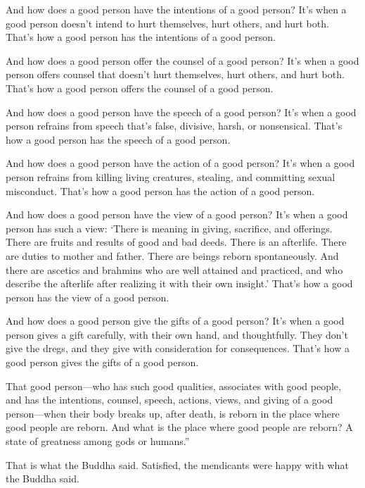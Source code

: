 \documentclass[12pt,openany]{book}%
\let\oldcontentsline\contentsline
\newcommand{\nopagecontentsline}[3]{\oldcontentsline{#1}{#2}{}}
\begin{document}
And how does a good person have the intentions of a good person? It’s when a good person doesn’t intend to hurt themselves, hurt others, and hurt both. That’s how a good person has the intentions of a good person. 

And how does a good person offer the counsel of a good person? It’s when a good person offers counsel that doesn’t hurt themselves, hurt others, and hurt both. That’s how a good person offers the counsel of a good person. 

And how does a good person have the speech of a good person? It’s when a good person refrains from speech that’s false, divisive, harsh, or nonsensical. That’s how a good person has the speech of a good person. 

And how does a good person have the action of a good person? It’s when a good person refrains from killing living creatures, stealing, and committing sexual misconduct. That’s how a good person has the action of a good person. 

And how does a good person have the view of a good person? It’s when a good person has such a view: ‘There is meaning in giving, sacrifice, and offerings. There are fruits and results of good and bad deeds. There is an afterlife. There are duties to mother and father. There are beings reborn spontaneously. And there are ascetics and brahmins who are well attained and practiced, and who describe the afterlife after realizing it with their own insight.’ That’s how a good person has the view of a good person. 

And how does a good person give the gifts of a good person? It’s when a good person gives a gift carefully, with their own hand, and thoughtfully. They don’t give the dregs, and they give with consideration for consequences. That’s how a good person gives the gifts of a good person. 

That good person—who has such good qualities, associates with good people, and has the intentions, counsel, speech, actions, views, and giving of a good person—when their body breaks up, after death, is reborn in the place where good people are reborn. And what is the place where good people are reborn? A state of greatness among gods or humans.” 

That is what the Buddha said. Satisfied, the mendicants were happy with what the Buddha said. 

%
\end{document}
